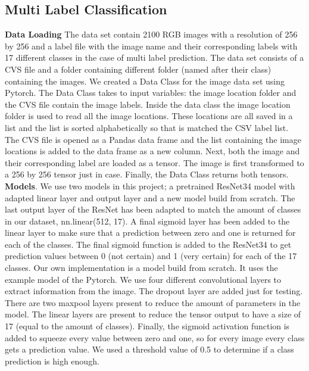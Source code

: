 \documentclass{article}
\begin{document}
\subsection{Multi Label Classification}
\textbf{Data Loading}
The data set contain 2100 RGB images with a resolution of 256 by 256 and a label file with the image name and their corresponding labels with 17 different classes in the case of multi label prediction.
The data set consists of a CVS file and a folder containing different folder (named after their class) containing the images.
We created a Data Class for the image data set using Pytorch. 
The Data Class takes to input variables: the image location folder and the CVS file contain the image labels.
Inside the data class the image location folder is used to read all the image locations.
These locations are all saved in a list and the list is sorted alphabetically so that is matched the CSV label list.
The CVS file is opened as a Pandas data frame and the list containing the image locations is added to the data frame as a new column.
Next, both the image and their corresponding label are loaded as a tensor.
The image is first transformed to a 256 by 256 tensor just in case. 
Finally, the Data Class returns both tensors.
\\

\noindent
\textbf{Models}.
We use two models in this project; a pretrained ResNet34 model with adapted linear layer and output layer and a new model build from scratch.
The last output layer of the ResNet has been adapted to match the amount of classes in our dataset, nn.linear(512, 17).
A final sigmoid layer has been added to the linear layer to make sure that a prediction between zero and one is returned for each of the classes. 
The final sigmoid function is added to the ResNet34 to get prediction values between 0 (not certain) and 1 (very certain) for each of the 17 classes. 
Our own implementation is a model build from scratch.
It uses the example model of the Pytorch. 
We use four different convolutional layers to extract information from the image. 
The dropout layer are added just for testing.
There are two maxpool layers present to reduce the amount of parameters in the model.
The linear layers are present to reduce the tensor output to have a size of 17 (equal to the amount of classes).
Finally, the sigmoid activation function is added to squeeze every value between zero and one, so for every image every class gets a prediction value.
We used a threshold value of 0.5 to determine if a class prediction is high enough.
\end{document}

